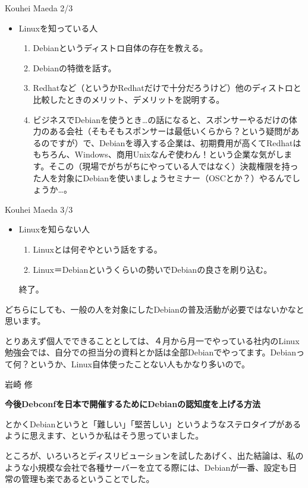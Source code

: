 \documentclass[cjk,dvipdfmx,12pt]{beamer}
\begin{document}
\begin{frame}{Kouhei Maeda 2/3}
\begin{itemize}
 \item  Linuxを知っている人
 \begin{enumerate}
 \item Debianというディストロ自体の存在を教える。
 \item Debianの特徴を話す。
 \item Redhatなど（というかRedhatだけで十分だろうけど）他のディストロと比較したときのメリット、デメリットを説明する。
 \item ビジネスでDebianを使うとき…の話になると、スポンサーやるだけの体力のある会社（そもそもスポンサーは最低いくらから？という疑問があるのですが）で、Debianを導入する企業は、初期費用が高くてRedhatはもちろん、Windows、商用Unixなんぞ使わん！という企業な気がします。そこの（現場でがちがちにやっている人ではなく）決裁権限を持った人を対象にDebianを使いましょうセミナー（OSCとか？）やるんでしょうか…。
 \end{enumerate}
\end{itemize}
\end{frame}\begin{frame}{Kouhei Maeda 3/3}
\begin{itemize}
 \item  Linuxを知らない人
 \begin{enumerate}
 \item Linuxとは何ぞやという話をする。
 \item Linux＝Debianというくらいの勢いでDebianの良さを刷り込む。
 \end{enumerate}
 終了。
\end{itemize}

どちらにしても、一般の人を対象にしたDebianの普及活動が必要ではないかなと思います。

とりあえず個人でできることとしては、４月から月一でやっている社内のLinux勉強会では、自分での担当分の資料とか話は全部Debianでやってます。Debianって何？というか、Linux自体使ったことない人もかなり多いので。

\end{frame}\begin{frame}{岩崎 修}

\textbf{今後Debconfを日本で開催するためにDebianの認知度を上げる方法}

とかくDebianというと「難しい」「堅苦しい」というようなステロタイプがあるように思えます、というか私はそう思っていました。

ところが、いろいろとディスリビューションを試したあげく、出た結論は、私のような小規模な会社で各種サーバーを立てる際には、Debianが一番、設定も日常の管理も楽であるということでした。


\end{frame}
\end{document}
